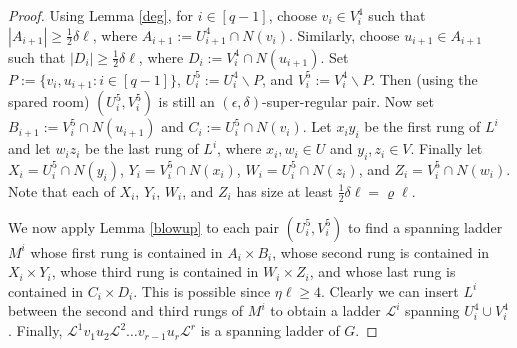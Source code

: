\documentclass[oneside,12pt]{memoir}
\newcommand{\ep}{\epsilon}
\newcommand{\half}{\frac{1}{2}}
\newcommand{\ssm}{\smallsetminus}
\begin{document}
\begin{proof}

Using Lemma \ref{deg}, for $i\in \left[q-1\right]$, choose $v_{i}\in V_{i}^{4}$ such that $|A_{i+1}| \geq \half \delta \ell$, where $A_{i+1}:=U_{i+1}^{4}\cap N(v_{i})$. Similarly, choose $u_{i+1}\in A_{i+1}$ such that $|D_{i}| \geq \half \delta \ell$, where 
$D_{i}:=V_i^4\cap N(u_{i+1})$. Set  $P:=\{v_i,u_{i+1}:i\in [q-1]\}$, $U_i^5:=U_i^4\ssm P$, and $V_i^5:=V_i^4\ssm P$. Then (using the spared room) $(U_i^5,V_i^5)$ is still an $(\ep,\delta)$-super-regular pair.
Now set $B_{i+1}:=V_i^5\cap N(u_{i+1})$ and $C_i:=U_i^5\cap N(v_i)$.
Let $x_{i}y_{i}$ be the first rung of $L^{i}$ and let $w_{i}z_{i}$ be the last rung of $L^{i}$, where $x_i,w_{i}\in U$ and $y_i,z_{i}\in V$. Finally let $X_{i}=U_{i}^{5}\cap N(y_{i})$, $Y_{i}=V_{i}^{5}\cap N(x_{i})$, $W_{i}=U_{i}^{5}\cap N( z_{i})$, and $Z_{i}=V_{i}^{5}\cap N(w_{i}) $. Note that each of $X_{i}$, $Y_{i}$, $W_{i}$, and $Z_{i}$ has size at least $\half \delta \ell = \varrho \ell$.




We now apply Lemma \ref{blowup} to each pair $(U_{i}^{5},V_{i}^{5})$ to find 
a spanning ladder $M^{i}$ whose first
rung is contained in $A_{i}\times B_{i}$, whose second rung is contained in $X_{i}\times Y_{i}$, whose third rung is contained in $W_{i} \times Z_{i}$, and whose last rung is contained in $C_{i}\times D_{i}$. This is possible since $\eta \ell\geq 4$. Clearly we can insert $L^{i}$ between the second and third rungs of $M^{i}$ to obtain a ladder $\mathcal{L}^{i}$ spanning $U_{i}^{4}\cup V_{i}^{4}$. Finally, $\mathcal{L}^{1}v_{1}u_{2}\mathcal{L}^{2}\dots v_{r-1}u_{r}\mathcal{L}^{r}$ is a spanning ladder of $G$.
\end{proof}
\end{document}
